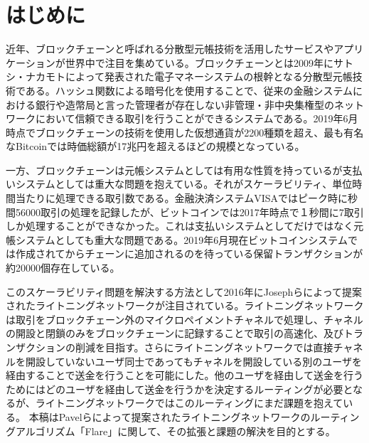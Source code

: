 \documentclass[12pt]{jarticle}
\begin{document}
\section{はじめに}
近年、ブロックチェーン\cite{satoshi}と呼ばれる分散型元帳技術を活用したサービスやアプリケーションが世界中で注目を集めている。ブロックチェーンとは2009年にサトシ・ナカモト\cite{satoshi}によって発表された電子マネーシステムの根幹となる分散型元帳技術である。ハッシュ関数による暗号化を使用することで、従来の金融システムにおける銀行や造幣局と言った管理者が存在しない非管理・非中央集権型のネットワークにおいて信頼できる取引を行うことができるシステムである。2019年6月時点でブロックチェーンの技術を使用した仮想通貨が2200種類を超え、最も有名なBitcoinでは時価総額が17兆円を超えるほどの規模となっている\cite{coin}。
\par
一方、ブロックチェーンは元帳システムとしては有用な性質を持っているが支払いシステムとしては重大な問題を抱えている。それがスケーラビリティ、単位時間当たりに処理できる取引数である。金融決済システムVISAではピーク時に秒間56000取引の処理を記録したが、ビットコインでは2017年時点で１秒間に7取引しか処理することができなかった\cite{joseph}。これは支払いシステムとしてだけではなく元帳システムとしても重大な問題である。2019年6月現在ビットコインシステムでは作成されてからチェーンに追加されるのを待っている保留トランザクションが約20000個存在している。
\par
このスケーラビリティ問題を解決する方法として2016年にJosephら\cite{joseph}によって提案されたライトニングネットワークが注目されている。ライトニングネットワークは取引をブロックチェーン外のマイクロペイメントチャネルで処理し、チャネルの開設と閉鎖のみをブロックチェーンに記録することで取引の高速化、及びトランザクションの削減を目指す。さらにライトニングネットワークでは直接チャネルを開設していないユーザ同士であってもチャネルを開設している別のユーザを経由することで送金を行うことを可能にした。他のユーザを経由して送金を行うためにはどのユーザを経由して送金を行うかを決定するルーティングが必要となるが、ライトニングネットワークではこのルーティングにまだ課題を抱えている。
本稿はPavelら\cite{flare}によって提案されたライトニングネットワークのルーティングアルゴリズム「Flare」に関して、その拡張と課題の解決を目的とする。
\end{document}

